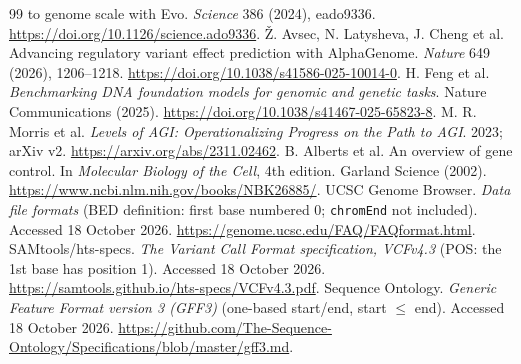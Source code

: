 \begin{thebibliography}{99}
to genome scale with Evo. \emph{Science} 386 (2024), eado9336.
\url{https://doi.org/10.1126/science.ado9336}.
 \v{Z}. Avsec, N. Latysheva, J. Cheng et al. Advancing
regulatory variant effect prediction with AlphaGenome. \emph{Nature} 649 (2026),
1206--1218. \url{https://doi.org/10.1038/s41586-025-10014-0}.
 H. Feng et al. \emph{Benchmarking DNA foundation
models for genomic and genetic tasks}. Nature Communications (2025).
\url{https://doi.org/10.1038/s41467-025-65823-8}.
 M. R. Morris et al. \emph{Levels of AGI:
Operationalizing Progress on the Path to AGI}. 2023; arXiv v2.
\url{https://arxiv.org/abs/2311.02462}.
 B. Alberts et al. An overview of gene control. In
\emph{Molecular Biology of the Cell}, 4th edition. Garland Science (2002).
\url{https://www.ncbi.nlm.nih.gov/books/NBK26885/}.
 UCSC Genome Browser. \emph{Data file formats} (BED definition:
first base numbered 0; \texttt{chromEnd} not included). Accessed 18 October 2026.
\url{https://genome.ucsc.edu/FAQ/FAQformat.html}.
 SAMtools/hts-specs. \emph{The Variant Call Format specification,
VCFv4.3} (POS: the 1st base has position 1). Accessed 18 October 2026.
\url{https://samtools.github.io/hts-specs/VCFv4.3.pdf}.
 Sequence Ontology. \emph{Generic Feature Format version 3
(GFF3)} (one-based start/end, start $\le$ end). Accessed 18 October 2026.
\url{https://github.com/The-Sequence-Ontology/Specifications/blob/master/gff3.md}.
\end{thebibliography}
